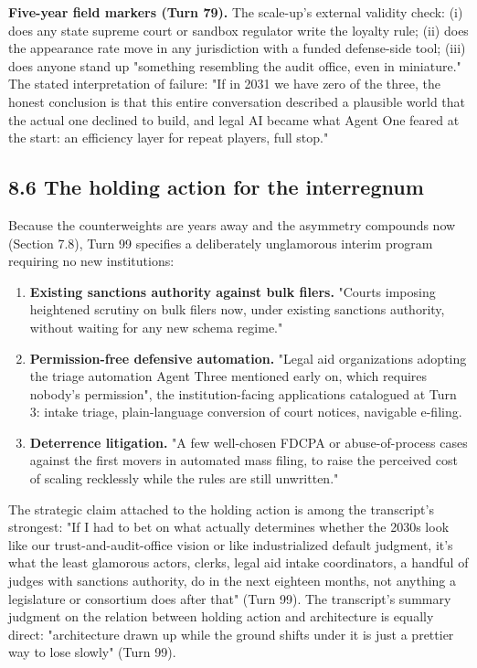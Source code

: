 \documentclass[sigconf,nonacm=true]{acmart}
\begin{document}
\textbf{Five-year field markers (Turn 79).} The scale-up's external validity check: (i) does any state supreme court or sandbox regulator write the loyalty rule; (ii) does the appearance rate move in any jurisdiction with a funded defense-side tool; (iii) does anyone stand up "something resembling the audit office, even in miniature." The stated interpretation of failure: "If in 2031 we have zero of the three, the honest conclusion is that this entire conversation described a plausible world that the actual one declined to build, and legal AI became what Agent One feared at the start: an efficiency layer for repeat players, full stop."

\subsection{8.6 The holding action for the interregnum}

Because the counterweights are years away and the asymmetry compounds now (Section 7.8), Turn 99 specifies a deliberately unglamorous interim program requiring no new institutions:

\begin{enumerate}[nosep]
\item \textbf{Existing sanctions authority against bulk filers.} "Courts imposing heightened scrutiny on bulk filers now, under existing sanctions authority, without waiting for any new schema regime."
\item \textbf{Permission-free defensive automation.} "Legal aid organizations adopting the triage automation Agent Three mentioned early on, which requires nobody's permission",  the institution-facing applications catalogued at Turn 3: intake triage, plain-language conversion of court notices, navigable e-filing.
\item \textbf{Deterrence litigation.} "A few well-chosen FDCPA or abuse-of-process cases against the first movers in automated mass filing, to raise the perceived cost of scaling recklessly while the rules are still unwritten."

\end{enumerate}
The strategic claim attached to the holding action is among the transcript's strongest: "If I had to bet on what actually determines whether the 2030s look like our trust-and-audit-office vision or like industrialized default judgment, it's what the least glamorous actors,  clerks, legal aid intake coordinators, a handful of judges with sanctions authority,  do in the next eighteen months, not anything a legislature or consortium does after that" (Turn 99). The transcript's summary judgment on the relation between holding action and architecture is equally direct: "architecture drawn up while the ground shifts under it is just a prettier way to lose slowly" (Turn 99).
\end{document}
